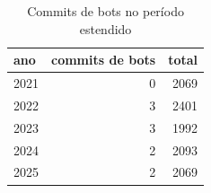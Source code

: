 \begin{table}[htbp]
\centering
\caption{Commits de bots no período estendido}
\label{tab:bots}
\begin{tabular}{lrr}
\toprule
ano & commits de bots & total \\
\midrule
2021 & 0 & 2069 \\
2022 & 3 & 2401 \\
2023 & 3 & 1992 \\
2024 & 2 & 2093 \\
2025 & 2 & 2069 \\
\bottomrule
\end{tabular}
\end{table}
